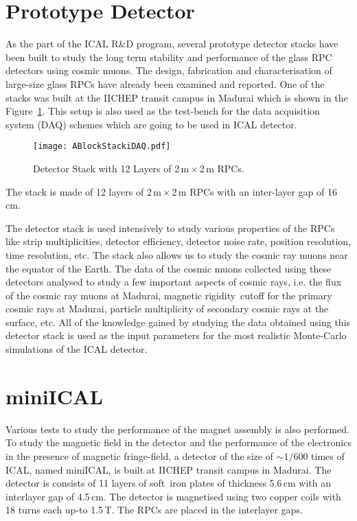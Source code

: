 \section{Prototype Detector}
As the part of the ICAL R\&D program, several prototype detector
stacks have been built to study the long term stability and
performance of the glass RPC detectors using cosmic muons. The design,
fabrication and characterisation of large-size glass RPCs have already
been examined and reported\cite{largerpc}. One of the stacks was built
at the IICHEP transit campus in Madurai which is shown in the
Figure~\ref{fig:ablock}. This setup is also used as the test-bench
for the data acquisition system (DAQ) schemes which are going to be
used in ICAL detector.
\begin{figure}[h]
  \centering
  \texttt{[image: ABlockStackiDAQ.pdf]}
  \caption{Detector Stack with 12 Layers of 2\,m\,$\times$\,2\,m RPCs.}
  \label{fig:ablock}
\end{figure}
The stack is made of 12 layers of 2\,m\,$\times$\,2\,m RPCs with an
inter-layer gap of 16\,cm.

The detector stack is used intensively to study various properties of
the RPCs like strip multiplicities, detector efficiency, detector
noise rate, position resolution, time resolution, etc. The stack also
allows us to study the cosmic ray muons near the equator of the Earth.
The data of the cosmic muons collected using these detectors analysed
to study a few important aspects of cosmic rays, i.e. the flux of
the cosmic ray muons at Madurai\cite{pethu1}, magnetic rigidity~cutoff
for the primary cosmic rays at Madurai, particle multiplicity of
secondary cosmic rays at the surface, etc. All of the knowledge gained
by studying the data obtained using this detector stack is used as the
input parameters for the most realistic Monte-Carlo simulations of the
ICAL detector.

\section{miniICAL}
Various tests to study the performance of the magnet assembly is also
performed. To study the magnetic field in the detector and the
performance of the electronics in the presence of magnetic
fringe-field, a detector of the size of $\sim 1/600$ times of ICAL,
named miniICAL, is built at IICHEP transit campus in Madurai. The
detector is consists of 11 layers of soft~iron plates of thickness
5.6\,cm with an interlayer gap of 4.5\,cm. The detector is magnetised
using two copper coils with 18 turns each up-to 1.5\,T. The RPCs are
placed in the interlayer gaps.

